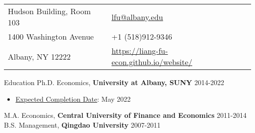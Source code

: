 \documentclass{resume_liang} %
\begin{document}
	
\begin{tabu} to \linewidth {X[l]X[r]}
	Hudson Building, Room 103     &  \href{mailto:lfu@albany.edu}{lfu@albany.edu}  \\
	1400 Washington Avenue        & +1 (518)912-9346\\
	Albany, NY 12222              & \href{https://liang-fu-econ.github.io/website/}{https://liang-fu-econ.github.io/website/}
\end{tabu}
\bigskip \bigskip










\begin{rSection}{Education}
Ph.D. Economics, {\bf University at Albany, SUNY}   \hfill   {2014-2022}    \vspace{0.1cm}              
  \begin{itemize}
  	\item[] \underline{Expected Completion Date}: May 2022
  \end{itemize}
M.A. Economics, {\bf Central University of Finance and Economics}    \hfill {2011-2014} \vspace{0.1cm}\\
B.S. Management, {\bf Qingdao University}                            \hfill {2007-2011} \vspace{0.1cm}\\
\end{rSection}
\bigskip \bigskip
\end{document}

